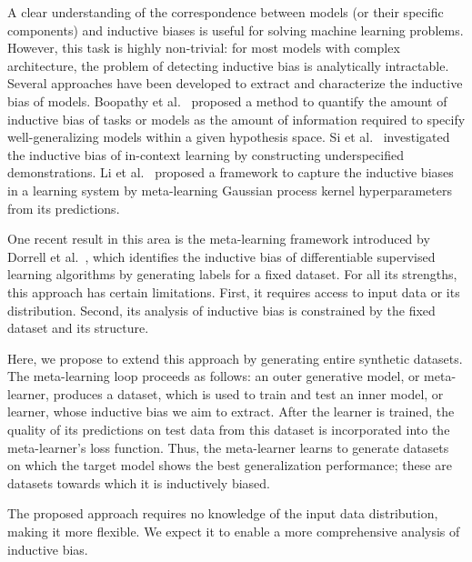 \documentclass{article}
\begin{document}
A clear understanding of the correspondence between models (or their specific components) and inductive biases is useful for solving machine learning problems. However, this task is highly non-trivial: for most models with complex architecture, the problem of detecting inductive bias is analytically intractable. Several approaches have been developed to extract and characterize the inductive bias of models. Boopathy et al.~\cite{boopathy2024exactcomputationinductivebias} proposed a method to quantify the amount of inductive bias of tasks or models as the amount of information required to specify well-generalizing models within a given hypothesis space. Si et al.~\cite{si2023measuringinductivebiasesincontext} investigated the inductive bias of in-context learning by constructing underspecified demonstrations. Li et al.~\cite{li2021meta} proposed a framework to capture the inductive biases in a learning system by meta-learning Gaussian process kernel hyperparameters from its predictions.

One recent result in this area is the meta-learning framework introduced by Dorrell et al.~\cite{dorrell2023metalearninginductivebiasessimple}, which identifies the inductive bias of differentiable supervised learning algorithms by generating labels for a fixed dataset. For all its strengths, this approach has certain limitations. First, it requires access to input data or its distribution. Second, its analysis of inductive bias is constrained by the fixed dataset and its structure. 

Here, we propose to extend this approach by generating entire synthetic datasets. The meta-learning loop proceeds as follows: an outer generative model, or meta-learner, produces a dataset, which is used to train and test an inner model, or learner, whose inductive bias we aim to extract. After the learner is trained, the quality of its predictions on test data from this dataset is incorporated into the meta-learner's loss function. Thus, the meta-learner learns to generate datasets on which the target model shows the best generalization performance; these are datasets towards which it is inductively biased.

The proposed approach requires no knowledge of the input data distribution, making it more flexible. We expect it to enable a more comprehensive analysis of inductive bias.
\end{document}
